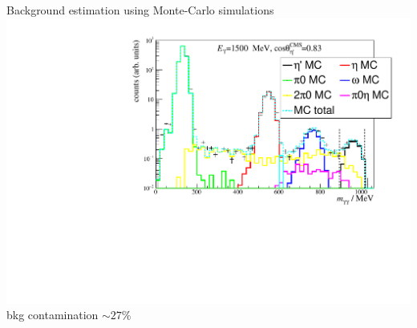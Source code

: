 \documentclass[11pt,aspectratio=169,dvipsnames]{beamer}
\begin{document}
	\begin{frame}{Background estimation using Monte-Carlo simulations}
		\centering
		\includegraphics[width=.8\linewidth]{figs/inv_mass_bin.pdf}\vspace{-0.5cm}\\
		bkg contamination $\sim 27\%$
	\end{frame}
\end{document}
